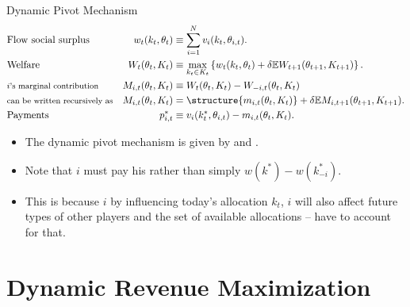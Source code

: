 \documentclass[english,10pt
,aspectratio=169
]{beamer}
\begin{document}
\begin{frame}{Dynamic Pivot Mechanism}
\vspace{-2em}\begin{align*}
	&\text{Flow social surplus}	& w_t(k_t,\theta_t)	&\equiv \sum_{i=1}^N v_i(k_t,\theta_{i,t}).
	\\
	&\text{Welfare}	& W_t(\theta_t,K_t)	&\equiv \max_{k_t \in K_t} \left\{ w_t(k_t,\theta_t) + \delta \mathbb{E} W_{t+1}(\theta_{t+1},K_{t+1}) \right\}.
	\\
	&\text{\footnotesize $i$'s marginal contribution}	& M_{i,t}(\theta_t,K_t)	&\equiv W_t(\theta_t,K_t) - W_{-i,t}(\theta_t,K_t)
	\\
	&\text{\footnotesize can be written recursively as}	& M_{i,t}(\theta_t,K_t)	&= \structure{m_{i,t}(\theta_t,K_t)} + \delta \mathbb{E} M_{i,t+1}(\theta_{t+1},K_{t+1}).
	\\
	&\text{Payments}	& p_{i,t}^*	&\equiv v_i(k^*_t,\theta_{i,t}) - m_{i,t}(\theta_t,K_t).
\end{align*}\vspace{-1em}

\begin{itemize}
	\item The dynamic pivot mechanism is given by \structure{$\kappa = \kappa^*$} and .
	\item Note that $i$ must pay his  rather than simply $w(k^*)-w(k^*_{-i})$.
	\item This is because $i$ by influencing today's allocation $k_t$, $i$ will also affect future types of other players and the set of available allocations -- have to account for that.
\end{itemize}
\end{frame}



\section{Dynamic Revenue Maximization}
\end{document}
